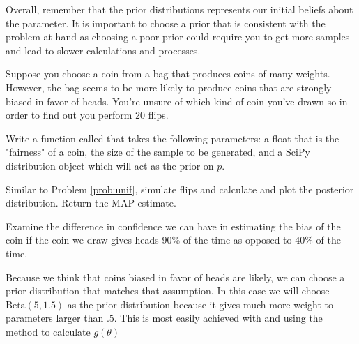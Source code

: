 Overall, remember that the prior distributions represents our initial beliefs about the parameter.
It is important to choose a prior that is consistent with the problem at hand as choosing a poor prior could require you to get more samples and lead to slower calculations and processes.

\begin{comment}
\subsection*{Updates}
Another important tool that is gained in using Bayesian methods is the Bayesian update.
This method is simple but brings important advantages.
The method of the Bayesian update is simply taking the posterior that has already been calculated, and using that as a prior in the next stage.

This method allows us to refine our guesses over time.
We may be in a situation where we are given a limited initial sample, and an estimate is required before a larger sample can be taken.
In these cases, we can compute the posterior given the first sample, then use that posterior as the prior when we receive our next sample.
This allow us to continually improve the confidence in our estimates and distribute that computation over a long period of time.
\end{comment}

\begin{problem}
  Suppose you choose a coin from a bag that produces coins of many weights.
  However, the bag seems to be more likely to produce coins that are strongly biased in favor of heads.
  You're unsure of which kind of coin you've drawn so in order to find out you perform 20 flips.

  Write a function called  that takes the following parameters:  a float that is the "fairness" of a coin,  the size of the sample to be generated, and  a SciPy distribution object which will act as the prior on $p$.

  Similar to Problem \ref{prob:unif}, simulate  flips and calculate and plot the posterior distribution. 
  Return the MAP estimate.

  Examine the difference in confidence we can have in estimating the bias of the coin if the coin we draw gives heads 90\% of the time as opposed to 40\% of the time.

  Because we think that coins biased in favor of heads are likely, we can choose a prior distribution that matches that assumption. 
  In this case we will choose $\text{Beta}(5,1.5)$ as the prior distribution because it gives much more weight to parameters larger than $.5$.
  This is most easily achieved with  and using the  method to calculate $g(\theta)$
\end{problem}


